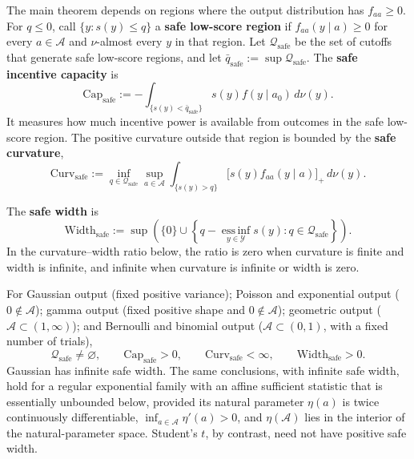 The main theorem depends on regions where the output distribution has
$f_{aa}\geq0$.  For $q\leq0$, call $\{y:s(y)\leq q\}$ a \textbf{safe
low-score region} if $f_{aa}(y\mid a)\geq0$ for every $a\in\mathcal A$ and
$\nu$-almost every $y$ in that region.  Let $\mathcal Q_{\mathrm{safe}}$ be the
set of cutoffs that generate safe low-score regions, and let
$\bar q_{\mathrm{safe}}:=\sup\mathcal Q_{\mathrm{safe}}$.  The \textbf{safe
incentive capacity} is
\begin{equation}
    \mathrm{Cap}_{\mathrm{safe}}
    :=-
    \int_{\{s(y)<\bar q_{\mathrm{safe}}\}}
    s(y)f(y\mid a_0)\,d\nu(y).
    \label{eq:safe-capacity}
\end{equation}
It measures how much incentive power is available from outcomes in the safe
low-score region.  The positive curvature outside that region is bounded by the
\textbf{safe curvature},
\begin{equation}
    \mathrm{Curv}_{\mathrm{safe}}
    :=\inf_{q\in\mathcal Q_{\mathrm{safe}}}
      \sup_{a\in\mathcal A}
      \int_{\{s(y)>q\}}
      \bigl[s(y)f_{aa}(y\mid a)\bigr]_+\,d\nu(y).
    \label{eq:safe-curvature}
\end{equation}

The \textbf{safe width} is
\begin{equation}
    \mathrm{Width}_{\mathrm{safe}}
    :=\sup\left(\{0\}\cup
    \left\{q-\operatorname*{ess\,inf}_{y\in\mathcal Y}s(y):
    q\in\mathcal Q_{\mathrm{safe}}\right\}\right).
    \label{eq:safe-width}
\end{equation}
In the curvature--width ratio below, the ratio is zero when curvature is finite
and width is infinite, and infinite when curvature is infinite or width is zero.

\begin{remark}
\label{rem:safe-tails-common-distributions}
For Gaussian output (fixed positive variance); Poisson and exponential output
($0\notin\mathcal A$); gamma output (fixed positive shape and $0\notin\mathcal A$);
geometric output ($\mathcal A\subset(1,\infty)$); and Bernoulli and binomial output
($\mathcal A\subset(0,1)$, with a fixed number of trials),
\[
    \mathcal Q_{\mathrm{safe}}\neq\varnothing,
    \qquad \mathrm{Cap}_{\mathrm{safe}}>0,
    \qquad \mathrm{Curv}_{\mathrm{safe}}<\infty,
    \qquad \mathrm{Width}_{\mathrm{safe}}>0.
\]
Gaussian has infinite safe width.  The same conclusions, with
infinite safe width, hold for a regular exponential family with an affine
sufficient statistic that is essentially unbounded below, provided its natural
parameter $\eta(a)$ is twice continuously differentiable,
$\inf_{a\in\mathcal A}\eta'(a)>0$, and $\eta(\mathcal A)$ lies in the interior
of the natural-parameter space.  Student's $t$, by contrast, need not have
positive safe width.
\end{remark}

